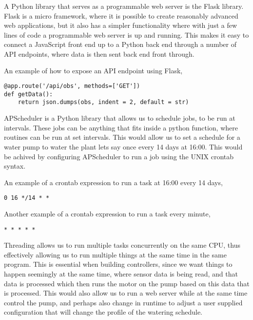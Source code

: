 \documentclass[a4paper,12pt,twoside,openright,titlepage]{book}
\begin{document}
\bigskip

A Python library that serves as a programmable web server is the Flask library. Flask is a micro framework, where it is possible to create reasonably advanced web applications, but it also has a simpler functionality where with just a few lines of code a programmable web server is up and running.
This makes it easy to connect a JavaScript front end up to a Python back end through a number of API endpoints, where data is then sent back end front through.

An example of how to expose an API endpoint using Flask,
\begin{verbatim}
@app.route('/api/obs', methods=['GET'])
def getData():
    return json.dumps(obs, indent = 2, default = str)
\end{verbatim}

\bigskip

APScheduler is a Python library that allows us to schedule jobs, to be run at intervals. These jobs can be anything that fits inside a python function, where routines can be run at set intervals. This would allow us to set a schedule for a water pump to water the plant lets say once every 14 days at 16:00.
This would be achived by configuring APScheduler to run a job using the UNIX crontab syntax.

\newpage

An example of a crontab expression to run a task at 16:00 every 14 days,
\begin{verbatim}
0 16 */14 * *
\end{verbatim}

Another example of a crontab expression to run a task every minute,
\begin{verbatim}
* * * * *
\end{verbatim}

\bigskip

Threading allows us to run multiple tasks concurrently on the same CPU, thus effectively allowing us to run multiple things at the same time in the same program.
This is essential when building controllers, since we want things to happen seemingly at the same time, where sensor data is being read, and that data is processed which then runs the motor on the pump based on this data that is processed.
This would also allow us to run a web server while at the same time control the pump, and perhaps also change in runtime to adjust a user supplied configuration that will change the profile of the watering schedule.

\bigskip
\end{document}
